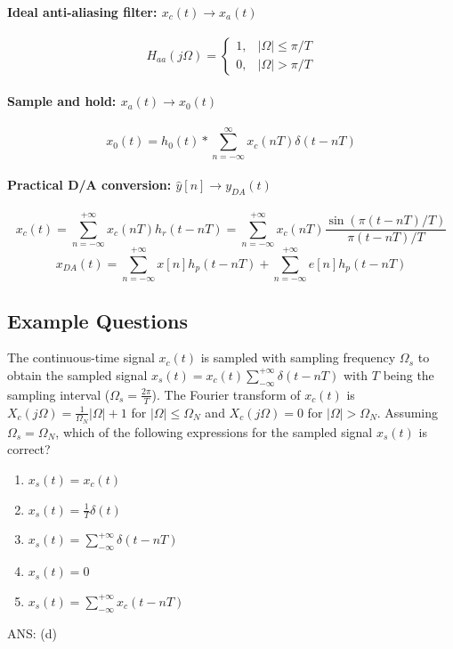 \paragraph{Ideal anti-aliasing filter: $x_{c}(t) \to x_{a}(t)$}
\[
    H_{aa}(j\Omega) = 
    \begin{cases}
    1,  & \lvert \Omega \rvert \leq \pi/T \\
    0,  & \lvert \Omega \rvert > \pi/T
    \end{cases}
\]

\paragraph{Sample and hold: $x_{a}(t) \to x_{0}(t)$}
\[
    x_0(t) = h_0(t) * \sum_{n=-\infty}^{\infty} x_{c}(nT)\delta(t-nT)
\]

\paragraph{Practical D/A conversion: $\hat{y}[n] \to y_{DA}(t)$}
\[
    x_{c}(t) = \sum_{n=-\infty}^{+\infty} x_{c}(nT)h_{r}(t-nT) = \sum_{n=-\infty}^{+\infty} x_{c}(nT) \frac{\sin(\pi(t-nT)/T)}{\pi(t-nT)/T}
\]
\[
    x_{DA}(t) = \sum_{n=-\infty}^{+\infty} x[n]h_{p}(t-nT) + \sum_{n=-\infty}^{+\infty} e[n]h_{p}(t-nT)
\]

\subsection{Example Questions}
\begin{q}{}
The continuous-time signal $x_{c}(t)$ is sampled with sampling frequency $\Omega_{s}$ to obtain the sampled signal $x_{s}(t) = x_{c}(t) \sum_{-\infty}^{+\infty} \delta(t-nT)$ with $T$ being the sampling interval ($\Omega_s = \frac{2\pi}{T}$). The Fourier transform of $x_{c}(t)$ is $X_{c}(j\Omega) = \frac{1}{\Omega_{N}} \lvert \Omega \rvert + 1$ for $\lvert \Omega \rvert \leq \Omega_N$ and $X_{c}(j\Omega) = 0$ for $\lvert \Omega \rvert > \Omega_N$. Assuming $\Omega_{s} = \Omega_{N}$, which of the following expressions for the sampled signal $x_{s}(t)$ is correct? 

\begin{enumerate}[label=(\alph*)]
    \item $x_{s}(t) = x_{c}(t)$
    \item $x_{s}(t) = \frac{1}{T}\delta(t)$
    \item $x_{s}(t) = \sum_{-\infty}^{+\infty} \delta(t-nT)$
    \item $x_{s}(t) = 0$
    \item $x_{s}(t) = \sum_{-\infty}^{+\infty} x_{c}(t-nT)$
\end{enumerate}

\begin{flushright}
\begin{blueenv}
    ANS: (d)
\end{blueenv}
\end{flushright}

\end{q}

